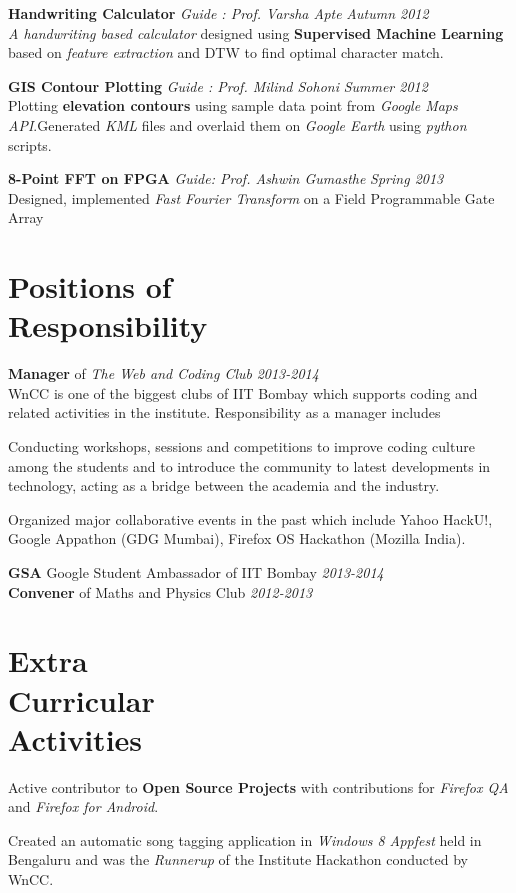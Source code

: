 \documentclass[margin,10pt]{resume}
\begin{document}
\begin{resume}
\textbf{Handwriting Calculator} \hfill
    \textsl{Guide : Prof. Varsha Apte} \hfill \emph{Autumn 2012}\\
 \emph{A handwriting based calculator} designed using \textbf{Supervised Machine Learning} based on \emph{feature extraction} and DTW to find optimal character match.

\textbf{GIS Contour Plotting}
  \hfill \textsl{Guide : Prof. Milind Sohoni} \hfill \emph{Summer 2012}\\
Plotting \textbf{elevation contours} using sample data point from \emph{Google Maps API}.Generated \emph{KML} files and overlaid them on \emph{Google Earth} using \emph{python} scripts.

\textbf{8-Point FFT on FPGA} \hfill \textsl{Guide: Prof. Ashwin Gumasthe} \hfill \emph{Spring 2013} \\
 Designed, implemented \emph{Fast Fourier Transform} on a Field Programmable Gate Array 

\section{\mysidestyle Positions of\\Responsibility } 
\textbf{Manager} of \emph{The Web and Coding Club} \hfill \emph{2013-2014}\\
WnCC is one of the biggest clubs of IIT Bombay which supports coding and related activities in the institute. Responsibility as a manager includes
\begin{list2}
\item Conducting workshops, sessions and competitions to improve coding culture among the students and to introduce the community to latest developments in technology, acting as a bridge between the academia and the industry. 
\item Organized major collaborative events in the past which include Yahoo HackU!, Google Appathon (GDG Mumbai), Firefox OS Hackathon (Mozilla India). 
\end{list2}\textbf{GSA} Google Student Ambassador of IIT Bombay \hfill \emph{2013-2014} \\
\textbf{Convener} of Maths and Physics Club \hfill \emph{2012-2013} 

\section{\mysidestyle Extra \\ Curricular \\ Activities }
\begin{list2}
\item Active contributor to \textbf{Open Source Projects} with contributions for \emph{Firefox QA} and \emph{Firefox for Android}.
\item Created an automatic song tagging application in \emph{Windows 8 Appfest} held in Bengaluru and was the \emph{Runnerup} of the Institute Hackathon conducted by WnCC.
\end{list2}

\end{resume}
\end{document}
